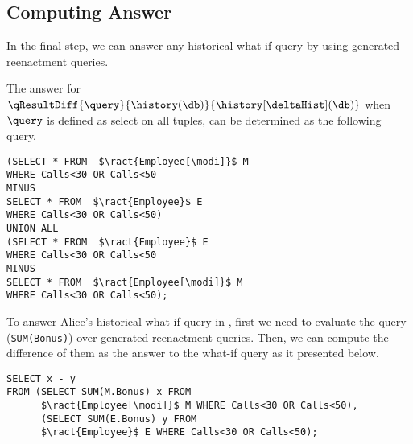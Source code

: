 \subsection{Computing Answer}
\label{sec:answer}
In the final step, we can answer any historical what-if query by using generated reenactment queries.
\begin{exam}
The answer for $\qResultDiff{\query}{\history(\db)}{\history[\deltaHist](\db)}$ when $\query$ is defined as select on all tuples, can be determined as the following query.
\begin{lstlisting}
(SELECT * FROM  $\ract{Employee[\modi]}$ M
WHERE Calls<30 OR Calls<50
MINUS
SELECT * FROM  $\ract{Employee}$ E
WHERE Calls<30 OR Calls<50)
UNION ALL
(SELECT * FROM  $\ract{Employee}$ E
WHERE Calls<30 OR Calls<50
MINUS
SELECT * FROM  $\ract{Employee[\modi]}$ M
WHERE Calls<30 OR Calls<50);
\end{lstlisting}
To answer Alice's historical what-if query in , first we need to evaluate the query (\lstinline!SUM(Bonus)!) over generated reenactment queries. Then, we can compute the difference of them as the answer to the what-if query as it presented below.
\begin{lstlisting}
SELECT x - y
FROM (SELECT SUM(M.Bonus) x FROM
	  $\ract{Employee[\modi]}$ M WHERE Calls<30 OR Calls<50),
      (SELECT SUM(E.Bonus) y FROM
      $\ract{Employee}$ E WHERE Calls<30 OR Calls<50);
\end{lstlisting}
\end{exam}
